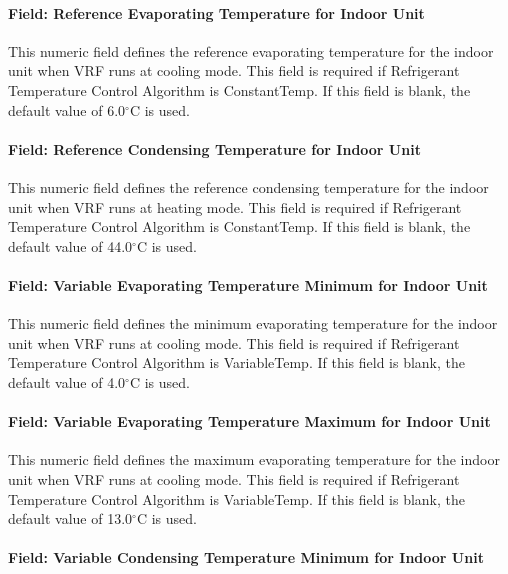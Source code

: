 \paragraph{Field: Reference Evaporating Temperature for Indoor Unit}\label{field-reference-evaporating-temperature-for-indoor-unit}

This numeric field defines the reference evaporating temperature for the indoor unit when VRF runs at cooling mode. This field is required if Refrigerant Temperature Control Algorithm is ConstantTemp. If this field is blank, the default value of 6.0$^\circ$C is used.

\paragraph{Field: Reference Condensing Temperature for Indoor Unit}\label{field-reference-condensing-temperature-for-indoor-unit}

This numeric field defines the reference condensing temperature for the indoor unit when VRF runs at heating mode. This field is required if Refrigerant Temperature Control Algorithm is ConstantTemp. If this field is blank, the default value of 44.0$^\circ$C is used.

\paragraph{Field: Variable Evaporating Temperature Minimum for Indoor Unit}\label{field-variable-evaporating-temperature-minimum-for-indoor-unit}

This numeric field defines the minimum evaporating temperature for the indoor unit when VRF runs at cooling mode. This field is required if Refrigerant Temperature Control Algorithm is VariableTemp. If this field is blank, the default value of 4.0$^\circ$C is used.

\paragraph{Field: Variable Evaporating Temperature Maximum for Indoor Unit}\label{field-variable-evaporating-temperature-maximum-for-indoor-unit}

This numeric field defines the maximum evaporating temperature for the indoor unit when VRF runs at cooling mode. This field is required if Refrigerant Temperature Control Algorithm is VariableTemp. If this field is blank, the default value of 13.0$^\circ$C is used.

\paragraph{Field: Variable Condensing Temperature Minimum for Indoor Unit}\label{field-variable-condensing-temperature-minimum-for-indoor-unit}

